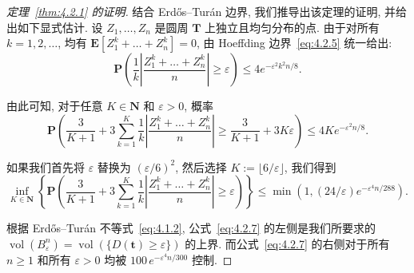 \begin{proof}[定理~\ref{thm:4.2.1} 的证明]
结合 Erd\H{o}s--Tur{\'a}n 边界, 我们推导出该定理的证明, 并给出如下显式估计.
设 $Z_1, \ldots, Z_n$ 是圆周 $\mathbf{T}$ 上独立且均匀分布的点.
由于对所有 $k = 1, 2, \ldots$, 均有 $\mathbf{E}[Z_1^k + \ldots + Z_n^k] = 0$, 由 Hoeffding 边界~\eqref{eq:4.2.5} 统一给出:
\begin{equation}\label{eq:4.2.6}
\mathbf{P}\left(\frac{1}{k} \left| \frac{Z_1^k + \ldots + Z_n^k}{n} \right| \ge \varepsilon\right) \le 4e^{-\varepsilon^2 k^2 n/8}.
\end{equation}

由此可知, 对于任意 $K \in \mathbf{N}$ 和 $\varepsilon > 0$, 概率
\[ \mathbf{P}\left(\frac{3}{K+1} + 3\sum_{k=1}^{K} \frac{1}{k} \left| \frac{Z_1^k + \ldots + Z_n^k}{n} \right| \ge \frac{3}{K+1} + 3K\varepsilon \right) \le 4Ke^{-\varepsilon^2 n/8}. \]

如果我们首先将 $\varepsilon$ 替换为 $(\varepsilon/6)^2$, 然后选择 $K := \lfloor 6/\varepsilon \rfloor$, 我们得到
\begin{equation}\label{eq:4.2.7}
\inf_{K \in \mathbf{N}} \left\{ \mathbf{P} \left( \frac{3}{K+1} + 3 \sum_{k=1}^{K} \frac{1}{k} \left| \frac{Z_1^k + \ldots + Z_n^k}{n} \right| \ge \varepsilon \right) \right\} \le \min \left( 1, (24/\varepsilon) e^{-\varepsilon^4 n/288} \right).
\end{equation}

根据 Erd\H{o}s--Tur{\'a}n 不等式~\eqref{eq:4.1.2}, 公式~\eqref{eq:4.2.7} 的左侧是我们所要求的 $\operatorname{vol}(B_{\varepsilon}^n) = \operatorname{vol}(\{D(\mathbf{t}) \geq \varepsilon\})$ 的上界.
而公式~\eqref{eq:4.2.7} 的右侧对于所有 $n \geq 1$ 和所有 $\varepsilon > 0$ 均被 $100 \, e^{-\varepsilon^4 n/300}$ 控制.
\end{proof}

